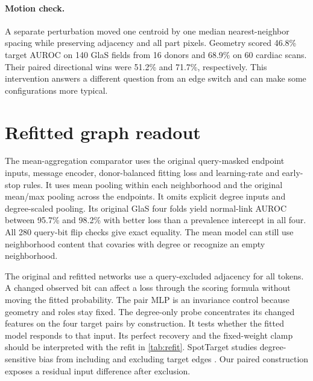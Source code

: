 \paragraph{Motion check.}
A separate perturbation moved one centroid by one median nearest-neighbor spacing while preserving adjacency and all part pixels. Geometry scored 46.8\% target AUROC on 140 GlaS fields from 16 donors and 68.9\% on 60 cardiac scans. Their paired directional wins were 51.2\% and 71.7\%, respectively. This intervention answers a different question from an edge switch and can make some configurations more typical.
\section{Refitted graph readout}
The mean-aggregation comparator uses the original query-masked endpoint inputs, message encoder, donor-balanced fitting loss and learning-rate and early-stop rules. It uses mean pooling within each neighborhood and the original mean/max pooling across the endpoints. It omits explicit degree inputs and degree-scaled pooling. Its original GlaS four folds yield normal-link AUROC between 95.7\% and 98.2\% with better loss than a prevalence intercept in all four. All 280 query-bit flip checks give exact equality. The mean model can still use neighborhood content that covaries with degree or recognize an empty neighborhood.

\begin{table}[t]
\centering
\caption{Response after refitting with mean aggregation. AUC and top-four recovery use absolute matched probability change and donor-macro aggregation. Top-four change is refit minus original in percentage points. Intervals are donor-paired. The tiers share donors.}
\label{tab:refit}
\small

\end{table}

The original and refitted networks use a query-excluded adjacency for all tokens. A changed observed bit can affect a loss through the scoring formula without moving the fitted probability. The pair MLP is an invariance control because geometry and roles stay fixed. The degree-only probe concentrates its changed features on the four target pairs by construction. It tests whether the fitted model responds to that input. Its perfect recovery and the fixed-weight clamp should be interpreted with the refit in \cref{tab:refit}. SpotTarget studies degree-sensitive bias from including and excluding target edges \cite{zhu2024spot}. Our paired construction exposes a residual input difference after exclusion.
